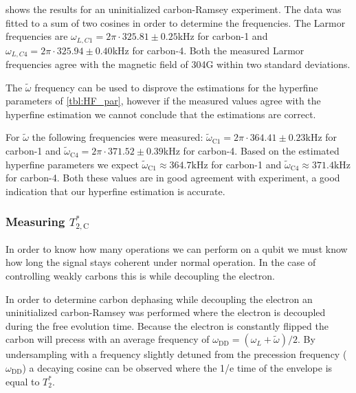  shows the results for an uninitialized carbon-Ramsey experiment.
The data was fitted to a sum of two cosines in order to determine the frequencies.
The Larmor frequencies are $\omega_{L,C1} = 2\pi\cdot 325.81 \pm 0.25$kHz  for carbon-1 and  $\omega_{L,C4} =  2\pi\cdot 325.94 \pm 0.40$kHz for carbon-4.
Both the measured Larmor frequencies agree with the magnetic field of 304G within two standard deviations.

The $\tilde{\omega}$ frequency can be used to disprove the estimations for the hyperfine parameters of \cref{tbl:HF_par}, however if the measured values agree with the hyperfine estimation we cannot conclude that the estimations are correct.

For $\tilde{\omega}$ the following frequencies were measured: $\tilde \omega_{\mathrm{C1}}= 2\pi\cdot 364.41 \pm 0.23$kHz for carbon-1
and $\tilde \omega_{\mathrm{C4}} = 2\pi\cdot 371.52 \pm 0.39 $kHz for carbon-4.
Based on the estimated hyperfine parameters we expect $\tilde\omega_{\mathrm{C1}} \approx 364.7\mathrm{kHz}$ for carbon-1 and $\tilde \omega_{\mathrm{C4}} \approx 371.4 \mathrm{kHz}$ for carbon-4.
Both these values are in good agreement with experiment, a good indication that our hyperfine estimation is accurate.


\subsubsection{Measuring $T_{2,\mathrm{C}}^* $}
In order to know how many operations we can perform on a qubit we must know how long the signal stays coherent under normal operation.
In the case of controlling weakly carbons this is while decoupling the electron.

In order to determine carbon dephasing while decoupling the electron an uninitialized carbon-Ramsey was performed where the electron is decoupled during the free evolution time.
Because the electron is constantly flipped the carbon will precess with an average frequency of $\omega_{\mathrm{DD}} = (\omega_L +\tilde{\omega} )/2$.
By undersampling with a frequency slightly detuned from the precession frequency ($\omega_{\mathrm{DD}}$) a decaying cosine can be observed where the 1/e time of the envelope is equal to $T_2^*$.

